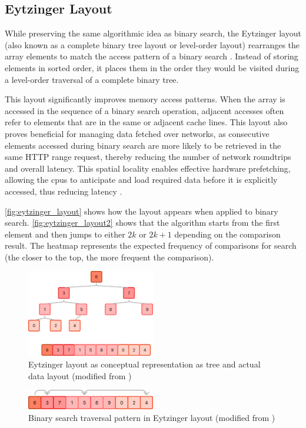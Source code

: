 \subsection{Eytzinger Layout}
\label{tb:eytzinger_layout}

While preserving the same algorithmic idea as binary search, the Eytzinger layout (also known as a complete binary tree layout or level-order layout) rearranges the array elements to match the access pattern of a binary search \citep{binary_search}. Instead of storing elements in sorted order, it places them in the order they would be visited during a level-order traversal of a complete binary tree.

This layout significantly improves memory access patterns. When the array is accessed in the sequence of a binary search operation, adjacent accesses often refer to elements that are in the same or adjacent cache lines. This layout also proves beneficial for managing data fetched over networks, as consecutive elements accessed during binary search are more likely to be retrieved in the same HTTP range request, thereby reducing the number of network roundtrips and overall latency. This spatial locality enables effective hardware prefetching, allowing the \acp{cpu} to anticipate and load required data before it is explicitly accessed, thus reducing latency \citep{binary_search}.

\autoref{fig:eytzinger_layout} shows how the layout appears when applied to binary search. \autoref{fig:eytzinger_layout2} shows that the algorithm starts from the first element and then jumps to either $2k$ or $2k+1$ depending on the comparison result. The heatmap represents the expected frequency of comparisons for search (the closer to the top, the more frequent the comparison).

\begin{figure}[ht]
  \centering
  \includegraphics[width=0.5\textwidth]{figs/related_work_theoretical_bg/eytzinger_layout.png}
  \caption{Eytzinger layout as conceptual representation as tree and actual data layout (modified from \citet{binary_search})}
  \label{fig:eytzinger_layout}
\end{figure}
\begin{figure}[ht]
  \centering
  \includegraphics[width=0.5\textwidth]{figs/related_work_theoretical_bg/eytzinger_layout2.png}
  \caption{Binary search traversal pattern in Eytzinger layout (modified from \citet{binary_search})}
  \label{fig:eytzinger_layout2}
\end{figure}

